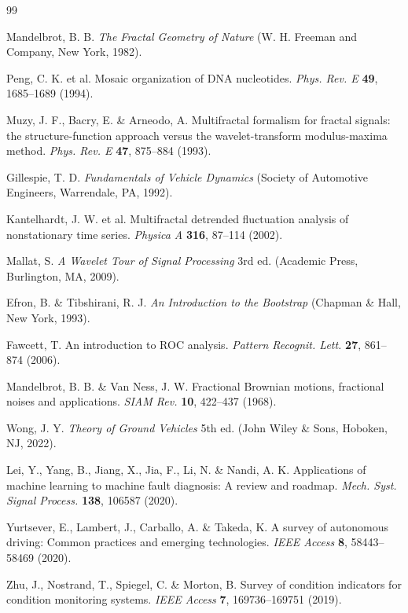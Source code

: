 \documentclass[11pt,letterpaper]{article}
\begin{document}
\begin{thebibliography}{99}

Mandelbrot, B. B. \textit{The Fractal Geometry of Nature} (W. H. Freeman and Company, New York, 1982).

Peng, C. K. et al. Mosaic organization of DNA nucleotides. \textit{Phys. Rev. E} \textbf{49}, 1685--1689 (1994).

Muzy, J. F., Bacry, E. \& Arneodo, A. Multifractal formalism for fractal signals: the structure-function approach versus the wavelet-transform modulus-maxima method. \textit{Phys. Rev. E} \textbf{47}, 875--884 (1993).

Gillespie, T. D. \textit{Fundamentals of Vehicle Dynamics} (Society of Automotive Engineers, Warrendale, PA, 1992).

Kantelhardt, J. W. et al. Multifractal detrended fluctuation analysis of nonstationary time series. \textit{Physica A} \textbf{316}, 87--114 (2002).

Mallat, S. \textit{A Wavelet Tour of Signal Processing} 3rd ed. (Academic Press, Burlington, MA, 2009).

Efron, B. \& Tibshirani, R. J. \textit{An Introduction to the Bootstrap} (Chapman \& Hall, New York, 1993).

Fawcett, T. An introduction to ROC analysis. \textit{Pattern Recognit. Lett.} \textbf{27}, 861--874 (2006).

Mandelbrot, B. B. \& Van Ness, J. W. Fractional Brownian motions, fractional noises and applications. \textit{SIAM Rev.} \textbf{10}, 422--437 (1968).

Wong, J. Y. \textit{Theory of Ground Vehicles} 5th ed. (John Wiley \& Sons, Hoboken, NJ, 2022).

Lei, Y., Yang, B., Jiang, X., Jia, F., Li, N. \& Nandi, A. K. Applications of machine learning to machine fault diagnosis: A review and roadmap. \textit{Mech. Syst. Signal Process.} \textbf{138}, 106587 (2020).

Yurtsever, E., Lambert, J., Carballo, A. \& Takeda, K. A survey of autonomous driving: Common practices and emerging technologies. \textit{IEEE Access} \textbf{8}, 58443--58469 (2020).

Zhu, J., Nostrand, T., Spiegel, C. \& Morton, B. Survey of condition indicators for condition monitoring systems. \textit{IEEE Access} \textbf{7}, 169736--169751 (2019).


\end{thebibliography}
\end{document}
